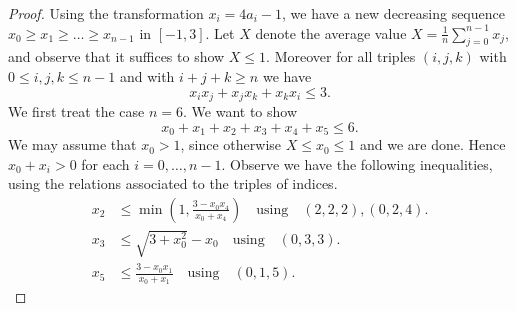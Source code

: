 \documentclass[a4paper,11pt,twoside]{amsart}
\theoremstyle{definition}
\numberwithin{equation}{section}
\begin{document}
\begin{proof}
Using the transformation $x_i = 4a_i - 1$, we have a new decreasing sequence $x_0 \geq x_1 \geq \dots \geq x_{n-1}$ in $[-1,3]$. Let $X$ denote the average value $X = \frac{1}{n}\sum_{j=0}^{n-1}x_j$, and observe that it suffices to show $X \leq 1.$ Moreover for all triples $(i,j,k)$ with $0 \leq i,j,k \leq n-1$ and with $i + j + k \geq n$ we have \begin{equation}
    x_ix_j + x_jx_k + x_kx_i \leq 3. \label{sym-x}
\end{equation} 
We first treat the case $n = 6$. We want to show $$x_0 + x_1 + x_2 + x_3 + x_4 + x_5 \leq 6.$$ We may assume that $x_0 > 1$, since otherwise $X \leq x_0 \leq 1$ and we are done. Hence $x_0 + x_i > 0$ for each $i = 0,\dots,n-1.$ Observe we have the following inequalities, using the relations associated to the triples of indices. 
\begin{align*}
    x_2 &\leq \min(1,\frac{3 - x_0x_4}{x_0 + x_4}) \quad \textrm{using} \quad (2,2,2),(0,2,4). \\
    x_3 &\leq \sqrt{3 + x_0^2} - x_0  \quad \textrm{using} \quad (0,3,3). \\
    x_5 &\leq \frac{3 - x_0x_1}{x_0 + x_1} \quad \textrm{using} \quad (0,1,5).
\end{align*}


\end{proof}
\end{document}
